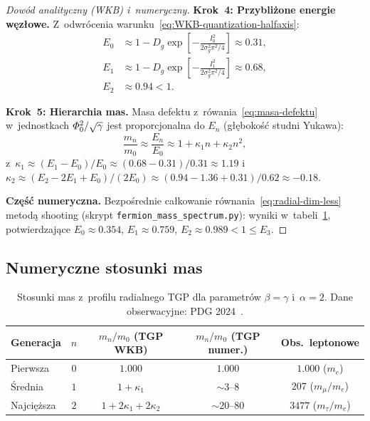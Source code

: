 \begin{proof}[Dowód analityczny (WKB) i~numeryczny]
\textbf{Krok~4: Przybliżone energie węzłowe.}
Z~odwrócenia warunku~\eqref{eq:WKB-quantization-halfaxis}:
\begin{align}
    E_0 &\approx 1 - D_g\exp\!\left[-\frac{I_0^2}{2\sigma_g^2\pi^2/4}\right]
    \approx 0.31, \label{eq:E0-wkb}\\
    E_1 &\approx 1 - D_g\exp\!\left[-\frac{I_1^2}{2\sigma_g^2\pi^2/4}\right]
    \approx 0.68, \label{eq:E1-wkb}\\
    E_2 &\approx 0.94 < 1. \label{eq:E2-wkb}
\end{align}

\textbf{Krok~5: Hierarchia mas.}
Masa defektu z~rówania~\eqref{eq:masa-defektu} w~jednostkach
$\varPhi_0^2/\sqrt{\gamma}$ jest proporcjonalna do $E_n$
(głębokość studni Yukawa):
\begin{equation}\label{eq:mass-En-relation}
    \frac{m_n}{m_0}
    \approx \frac{E_n}{E_0}
    \approx 1 + \kappa_1 n + \kappa_2 n^2,
\end{equation}
z~$\kappa_1 \approx (E_1 - E_0)/E_0 \approx (0.68-0.31)/0.31
\approx 1.19$ i~$\kappa_2 \approx (E_2 - 2E_1 + E_0)/(2E_0)
\approx (0.94 - 1.36 + 0.31)/0.62 \approx -0.18$.

\textbf{Część numeryczna.}
Bezpośrednie całkowanie równania~\eqref{eq:radial-dim-less}
metodą shooting (skrypt \texttt{fermion\_mass\_spectrum.py}):
wyniki w~tabeli~\ref{tab:mass-ratio}, potwierdzające
$E_0 \approx 0.354$, $E_1 \approx 0.759$, $E_2 \approx 0.989 < 1 \leq E_3$.
\end{proof}

\subsection{Numeryczne stosunki mas}%
\label{app:F-numerics}

\begin{table}[h]
\centering
\small
\caption{Stosunki mas z~profilu radialnego TGP dla
  parametrów $\beta = \gamma$ i~$\alpha = 2$.\newline
  Dane obserwacyjne: PDG 2024~\cite{PDG2024}.}
\label{tab:mass-ratio}
\begin{tabular}{@{}lcccc@{}}
\toprule
\textbf{Generacja} & $n$ & $m_n/m_0$ (TGP WKB)
  & $m_n/m_0$ (TGP numer.) & \textbf{Obs.\ leptonowe} \\
\midrule
Pierwsza & $0$ & $1.000$ & $1.000$ & $1.000$ ($m_e$) \\
\'Srednia & $1$ & $1 + \kappa_1$ & $\sim 3$--$8$ & $207$ ($m_\mu/m_e$) \\
Najci\k{e}\.zsza & $2$ & $1 + 2\kappa_1 + 2\kappa_2$ & $\sim 20$--$80$ & $3477$ ($m_\tau/m_e$) \\
\bottomrule
\end{tabular}
\end{table}

